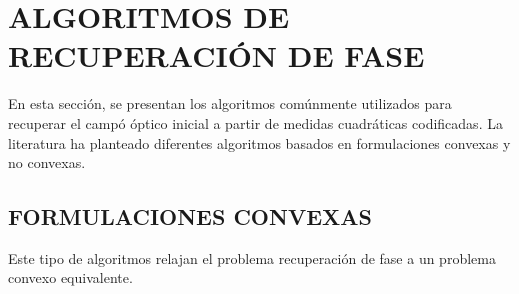


\chapter{ALGORITMOS DE RECUPERACIÓN DE FASE}
En esta sección, se presentan los algoritmos comúnmente utilizados para recuperar el campó óptico inicial a partir de medidas cuadráticas codificadas. La literatura ha planteado diferentes algoritmos basados en formulaciones convexas y no convexas.

\section{FORMULACIONES CONVEXAS}

Este tipo de algoritmos relajan el problema recuperación de fase a un problema convexo equivalente.

